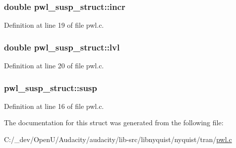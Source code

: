 \subsubsection[{\texorpdfstring{incr}{incr}}]{\setlength{\rightskip}{0pt plus 5cm}double pwl\+\_\+susp\+\_\+struct\+::incr}\hypertarget{structpwl__susp__struct_ad391b054997dfbc02a588f55aae285ea}{}\label{structpwl__susp__struct_ad391b054997dfbc02a588f55aae285ea}


Definition at line 19 of file pwl.\+c.

\subsubsection[{\texorpdfstring{lvl}{lvl}}]{\setlength{\rightskip}{0pt plus 5cm}double pwl\+\_\+susp\+\_\+struct\+::lvl}\hypertarget{structpwl__susp__struct_ad7e05416ac642655c140e9fa0eb6ba5d}{}\label{structpwl__susp__struct_ad7e05416ac642655c140e9fa0eb6ba5d}


Definition at line 20 of file pwl.\+c.

\subsubsection[{\texorpdfstring{susp}{susp}}]{ pwl\+\_\+susp\+\_\+struct\+::susp}\hypertarget{structpwl__susp__struct_aa7becf7ae484f52e935c38e41ee6344c}{}\label{structpwl__susp__struct_aa7becf7ae484f52e935c38e41ee6344c}


Definition at line 16 of file pwl.\+c.



The documentation for this struct was generated from the following file\+:\begin{DoxyCompactItemize}
\item 
C\+:/\+\_\+dev/\+Open\+U/\+Audacity/audacity/lib-\/src/libnyquist/nyquist/tran/\hyperlink{pwl_8c}{pwl.\+c}\end{DoxyCompactItemize}
